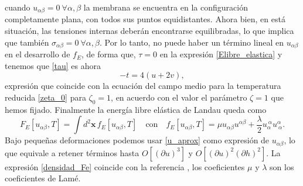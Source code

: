 cuando $u_{\alpha\beta}=0 \ \forall\alpha,\beta$ la membrana se encuentra en
la configuración completamente plana, con todos sus puntos
equidistantes. Ahora bien, en está situación, las tensiones internas deberán
encontrarse equilibradas\cite{Landau_Elasticidad}, lo que implica que también $\sigma_{\alpha\beta}=0 \
\forall\alpha,\beta$. Por lo tanto, no puede haber 
un término lineal en $u_{\alpha\beta}$ en el desarrollo de $f_E$, de forma que,
 $\tau=0$ en la expresión \eqref{Elibre_elastica} y tenemos que \eqref{tau} es ahora
\begin{equation}\label{tau=0}
-t=4(u+2v),
\end{equation}   
expresión que coincide con la ecuación del campo medio para la temperatura reducida
\eqref{zeta_0} para $\zeta_0=1$, en acuerdo con el valor el parámetro $\zeta=1$
que hemos fijado. Finalmente la energía libre elástica de Landau queda como
\begin{equation}
F_E[u_{\alpha\beta},T]=\int d^2\mathbf{x}\, f_E[u_{\alpha\beta},T]\quad \text{con}\quad
f_E[u_{\alpha\beta},T]=
\mu u_{\alpha\beta}u^{\alpha\beta} +
\frac{\lambda}{2}u_{\alpha}^{\ \alpha}u^{\alpha}_{\ \alpha}\label{densidad_Fe}.
\end{equation} 
Bajo pequeñas deformaciones podemos usar \eqref{u_aprox} 
como expresión de $u_{\alpha\beta}$, lo que equivale a retener términos hasta
$O[(\partial u)^3]$ y $O[(\partial u)^2(\partial h)^2]$. La expresión
\eqref{densidad_Fe} coincide con la referencia \cite{Landau_Elasticidad}, los coeficientes $\mu$ y
$\lambda$ son los coeficientes de Lamé.  

